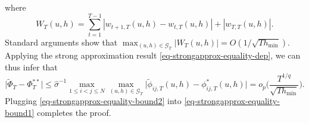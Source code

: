 \documentclass[a4paper,12pt]{article}
\numberwithin{equation}{section}
\begin{document}
where
\[ W_T(u,h) = \sum\limits_{t=1}^{T-1} |w_{t+1,T}(u,h) - w_{t,T}(u,h)| + |w_{T,T}(u,h)|. \]
Standard arguments show that $\max_{(u,h) \in \mathcal{G}_T} |W_T(u,h)| = O( 1/\sqrt{Th_{\min}} )$. Applying the strong approximation result \eqref{eq-strongapprox-equality-dep}, we can thus infer that 
\begin{equation}\label{eq-strongapprox-equality-bound2}
\big| \widetilde{\Phi}_T - \Phi_T^{**} \big| \le \widehat{\sigma}^{-1} \max_{1\le i<j \le N} \max_{(u,h) \in \mathcal{G}_T} \big| \widetilde{\phi}_{ij,T}(u,h) - \phi_{ij,T}^*(u,h) \big| = o_p \Big( \frac{T^{1/q}}{\sqrt{Th_{\min}}} \Big). 
\end{equation}
Plugging \eqref{eq-strongapprox-equality-bound2} into \eqref{eq-strongapprox-equality-bound1} completes the proof.
\end{document}
